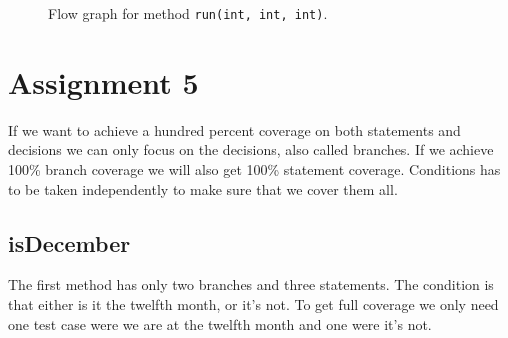 \documentclass[a4paper]{article}
\begin{document}
\begin{figure}[htpb!]
    \begin{center}
        \caption{Flow graph for method \texttt{run(int, int, int)}.}
        \label{figure:run}
    \end{center}
\end{figure}

\section*{Assignment 5}

If we want to achieve a hundred percent coverage on both statements and decisions we can only focus on the decisions, also called branches. If we achieve 100\% branch coverage we will also get 100\% statement coverage. Conditions has to be taken independently to make sure that we cover them all.

\subsection*{isDecember}

The first method has only two branches and three statements. The condition is that either is it the twelfth month, or it's not. To get full coverage we only need one test case were we are at the twelfth month and one were it's not.
\end{document}
